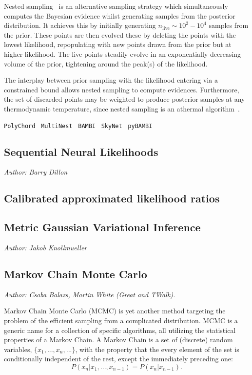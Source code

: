 \documentclass[11pt]{article}
\begin{document}
Nested sampling~\cite{Skilling:2006gxv} is an alternative sampling strategy which simultaneously computes the Bayesian evidence whilst generating samples from the posterior distribution.
It achieves this by initially generating $n_\mathrm{live}\sim10^2-10^4$ samples from the prior. These points are then evolved these by deleting the points with the lowest likelihood, repopulating with new points drawn from the prior but at higher likelihood. The live points steadily evolve in an exponentially decreasing volume of the prior, tightening around the peak(s) of the likelihood.

The interplay between prior sampling with the likelihood entering via a constrained bound allows nested sampling to compute evidences. Furthermore, the set of discarded points may be weighted to produce posterior samples at any thermodynamic temperature, since nested sampling is an athermal algorithm~\cite{aeons}.

\texttt{PolyChord}~\cite{2015MNRAS.453.4384H,Handley:2015fda}
\texttt{MultiNest}~\cite{Feroz:2007kg,Feroz:2008xx,Feroz:2013hea}
\texttt{BAMBI}~\cite{Graff:2011gv}
\texttt{SkyNet}~\cite{Graff:2013cla}
\texttt{pyBAMBI}~\cite{pybambi}


\subsection{Sequential Neural Likelihoods}
\emph{Author: Barry Dillon}

\subsection{Calibrated approximated likelihood ratios}

\subsection{Metric Gaussian Variational Inference}
\emph{Author: Jakob Knollmueller}

\subsection{Markov Chain Monte Carlo}
\label{sec:MCMC}
\emph{Author: Csaba Balazs, Martin White (Great and TWalk).} 

Markov Chain Monte Carlo (MCMC) is yet another method targeting the problem of the efficient sampling from a complicated distribution.  
%
MCMC is a generic name for a collection of specific algorithms, all utilizing the statistical properties of a Markov Chain.
%
A Markov Chain is a set of (discrete) random variables, $\{x_1, ..., x_n, ...\}$, with the property that the every element of the set is conditionally independent of the rest, except the immediately preceding one:
\begin{equation}
	P(x_n|x_1,...,x_{n-1}) = P(x_n|x_{n-1}) .
\end{equation}
\end{document}
